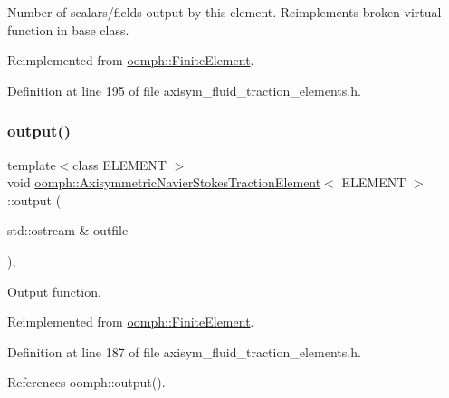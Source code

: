 Number of scalars/fields output by this element. Reimplements broken virtual function in base class. 



Reimplemented from \hyperlink{classoomph_1_1FiniteElement_a865e2e5586552ba80babdbe26a77fe8c}{oomph\+::\+Finite\+Element}.



Definition at line 195 of file axisym\+\_\+fluid\+\_\+traction\+\_\+elements.\+h.

\mbox{\label{classoomph_1_1AxisymmetricNavierStokesTractionElement_afec508c380a63dc12a95317224c85553}} 
\subsubsection{\texorpdfstring{output()}{output()}\hspace{0.1cm}{\footnotesize\ttfamily [1/4]}}
{\footnotesize\ttfamily template$<$class E\+L\+E\+M\+E\+NT $>$ \\
void \hyperlink{classoomph_1_1AxisymmetricNavierStokesTractionElement}{oomph\+::\+Axisymmetric\+Navier\+Stokes\+Traction\+Element}$<$ E\+L\+E\+M\+E\+NT $>$\+::output (\begin{DoxyParamCaption}\item[{std\+::ostream \&}]{outfile }\end{DoxyParamCaption})\hspace{0.3cm}{\ttfamily [inline]}, {\ttfamily [virtual]}}



Output function. 



Reimplemented from \hyperlink{classoomph_1_1FiniteElement_a2ad98a3d2ef4999f1bef62c0ff13f2a7}{oomph\+::\+Finite\+Element}.



Definition at line 187 of file axisym\+\_\+fluid\+\_\+traction\+\_\+elements.\+h.



References oomph\+::output().

\mbox{\label{classoomph_1_1AxisymmetricNavierStokesTractionElement_a903801e976db27eb831a17349838877d}} 
